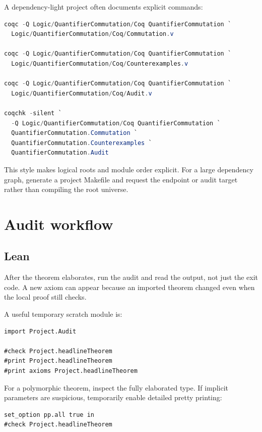 \documentclass[
  10pt,
  a4paper,
  twoside,
  open=any,
  parskip=half,
  headings=big
]{scrreprt}
\newcommand{\code}[1]{\texttt{\detokenize{#1}}}
\begin{document}
A dependency-light project often documents explicit commands:

\begin{lstlisting}[language=PowerShell]
coqc -Q Logic/QuantifierCommutation/Coq QuantifierCommutation `
  Logic/QuantifierCommutation/Coq/Commutation.v

coqc -Q Logic/QuantifierCommutation/Coq QuantifierCommutation `
  Logic/QuantifierCommutation/Coq/Counterexamples.v

coqc -Q Logic/QuantifierCommutation/Coq QuantifierCommutation `
  Logic/QuantifierCommutation/Coq/Audit.v

coqchk -silent `
  -Q Logic/QuantifierCommutation/Coq QuantifierCommutation `
  QuantifierCommutation.Commutation `
  QuantifierCommutation.Counterexamples `
  QuantifierCommutation.Audit
\end{lstlisting}

This style makes logical roots and module order explicit.  For a large
dependency graph, generate a project Makefile and request the endpoint
\code{.vo} or audit target rather than compiling the root universe.

\section{Audit workflow}

\subsection{Lean}

After the theorem elaborates, run the audit and read the output, not just the
exit code.  A new axiom can appear because an imported theorem changed even
when the local proof still checks.

A useful temporary scratch module is:

\begin{lstlisting}[language=Lean]
import Project.Audit

#check Project.headlineTheorem
#print Project.headlineTheorem
#print axioms Project.headlineTheorem
\end{lstlisting}

For a polymorphic theorem, inspect the fully elaborated type.  If implicit
parameters are suspicious, temporarily enable detailed pretty printing:

\begin{lstlisting}[language=Lean]
set_option pp.all true in
#check Project.headlineTheorem
\end{lstlisting}
\end{document}
